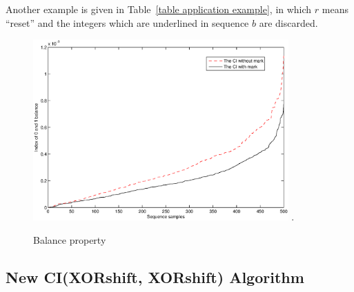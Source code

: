 Another example is given in Table~\ref{table application example}, in which $r$ means ``reset'' and the integers which are underlined in sequence $b$ are discarded.
%






\begin{figure}
\centering
\includegraphics[width=3.85in]{images/nmark.eps}
\DeclareGraphicsExtensions.
\caption{Balance property}
\label{nmark}
\end{figure}

\subsection{New CI(XORshift, XORshift) Algorithm}

